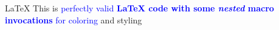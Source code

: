 \usepackage{xcolor}

\newcommand{\tcgreen}[1]{\textcolor{green}{#1}}
\renewcommand{\tcgreen}[1]{\textcolor{green}{#1}}

\newcommand{\tcred}[1]{\textcolor{red}{#1}}
\newcommand{\tcblue}[1]{\textcolor{blue}{#1}}


\begin{testenv}{\LaTeX}
This is \tcblue{perfectly valid \textbf{\LaTeX{} code with some \textit{nested}
macro invocations} for coloring} and styling
\end{testenv}

\code

